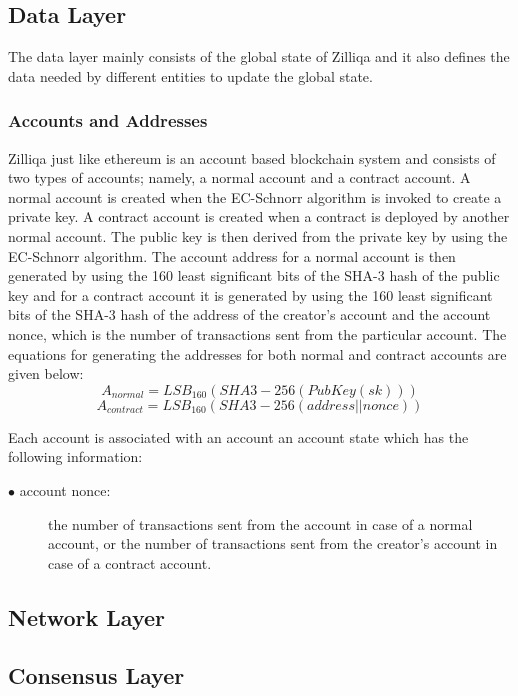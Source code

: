 \documentclass[a4paper,twoside,phd]{BYUPhys}
\begin{document}
\subsection{Data Layer}
The data layer mainly consists of the global state of Zilliqa and it also defines the data needed by different entities to update the global state. 
\subsubsection{Accounts and Addresses}
Zilliqa just like ethereum is an account based blockchain system and consists of two types of accounts; namely, a normal account and a contract account. A normal account is created when the EC-Schnorr algorithm is invoked to create a private key. A contract account is created when a contract is deployed by another normal account. The public key is then derived from the private key by using the EC-Schnorr algorithm. The account address for a normal account is then generated by using the 160 least significant bits of the SHA-3 hash of the public key and for a contract account it is generated by using the 160 least significant bits of the SHA-3 hash of the address of the creator's account and the account nonce, which is the number of transactions sent from the particular account. The equations for generating the addresses for both normal and contract accounts are given below:
\begin{equation}
    A_{normal} = LSB_{160}(SHA3-256(PubKey(sk)))
\end{equation}
\begin{equation}
    A_{contract} = LSB_{160}(SHA3-256(address||nonce))
\end{equation}

Each account is associated with an account an account state which has the following information:
\begin{description}
\item[$\bullet$ account nonce:] the number of transactions sent from the account in case of a normal account, or the number of transactions sent from the creator's account in case of a contract account.
\end{description}
\subsection{Network Layer}
\subsection{Consensus Layer}
\end{document}
